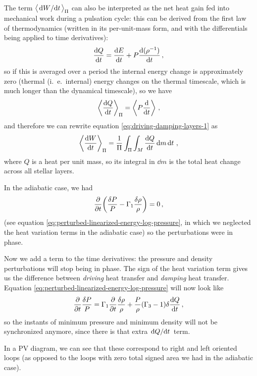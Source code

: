 \documentclass[main.tex]{subfiles}
\begin{document}
The term \(\expval{\dv*{W}{t}}_\Pi \) can also be interpreted as the net heat gain fed into mechanical work during a pulsation cycle: this can be derived from the first law of thermodynamics (written in its per-unit-mass form, and with the differentials being applied to time derivatives): 
%
\begin{align}
\dv{Q}{t} = \dv{E}{t} + P \dv{(\rho^{-1})}{t}
\,,
\end{align}
%
so if this is averaged over a period the internal energy change is approximately zero (thermal (i.\ e.\ internal) energy changes on the thermal timescale, which is much longer than the dynamical timescale), so we have 
%
\begin{align}
\expval{\dv{Q}{t}}_{\Pi } = \expval{P \dv{}{t} (\rho^{-1})}
\,,
\end{align}
%
and therefore we can rewrite equation \eqref{eq:driving-damping-layers-1} as 
%
\begin{align}
\expval{\dv{W}{t}}_{\Pi } = \frac{1}{\Pi } \int_{\Pi } \int_{M} \dv{Q}{t} \dd{m} \dd{t}
\,,
\end{align}
%
where \(Q\) is a heat per unit mass, so its integral in \(\dd{m}\) is the total heat change across all stellar layers.

In the adiabatic case, we had 
%
\begin{align}
\pdv{}{t}\qty( \frac{\delta P}{P} - \Gamma_1 \frac{\delta \rho}{\rho}) =0
\,,
\end{align}
%
(see equation \eqref{eq:perturbed-linearized-energy-log-pressure}, in which we neglected the heat variation terms in the adiabatic case) so the perturbations were in phase.

Now we add a term to the time derivatives: the pressure and density perturbations will stop being in phase. The sign of the heat variation term gives us the difference between \emph{driving} heat transfer and \emph{damping} heat transfer. Equation \eqref{eq:perturbed-linearized-energy-log-pressure} will now look like 
%
\begin{align}
\pdv{}{t} \frac{ \delta P}{P} = \Gamma_1 \pdv{}{t} \frac{ \delta \rho }{\rho } + \frac{P}{\rho } (\Gamma_3 -1) \delta \dv{Q}{t}
\,,
\end{align}
%
so the instants of minimum pressure and minimum density will not be synchronized anymore, since there is that extra \(\dv*{Q}{t}\) term. 

In a PV diagram, we can see that these correspond to right and left oriented loops (as opposed to the loops with zero total signed area we had in the adiabatic case).
\end{document}
